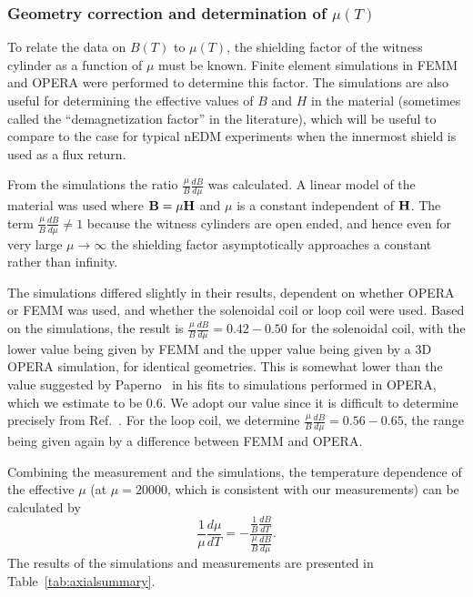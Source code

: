 




\subsubsection{Geometry correction and determination of $\mu(T)$\label{sec:axialsims}}

To relate the data on $B(T)$ to $\mu(T)$, the shielding factor of the
witness cylinder as a function of $\mu$ must be known.  Finite element
simulations in FEMM and OPERA were performed to determine this factor.
The simulations are also useful for determining the effective values
of $B$ and $H$ in the material (sometimes called the ``demagnetization
factor'' in the literature), which will be useful to compare to the
case for typical nEDM experiments when the innermost shield is used as
a flux return.


From the simulations the ratio $\frac{\mu}{B} \frac{dB}{d\mu}$ was
calculated.  A linear model of the material was used where
$\bold{B}=\mu \bold{H}$ and $\mu$ is a constant independent of
$\bold{H}$.  The term $\frac{\mu}{B}\frac{dB}{d\mu}\neq 1$ because the
witness cylinders are open ended, and hence even for very large
$\mu\rightarrow\infty$ the shielding factor asymptotically approaches
a constant rather than infinity.

The simulations differed slightly in their results, dependent on
whether OPERA or FEMM was used, and whether the solenoidal coil or
loop coil were used.
Based on the simulations, the result is
$\frac{\mu}{B}\frac{dB}{d\mu}=0.42-0.50$ for the solenoidal coil, with
the lower value being given by FEMM and the upper value being given by
a 3D OPERA simulation, for identical geometries.  This is somewhat
lower than the value suggested by
Paperno~\cite{bib:paperno-open-ended} in his fits to simulations
performed in OPERA, which we estimate to be 0.6.  We adopt our value
since it is difficult to determine precisely from
Ref.~\cite{bib:paperno-open-ended}.  For the loop coil, we determine
$\frac{\mu}{B}\frac{dB}{d\mu}=0.56-0.65$, the range being given again
by a difference between FEMM and OPERA.


Combining the measurement and the simulations, the temperature
dependence of the effective $\mu$ (at $\mu=20 000$, which is consistent
with our measurements) can be calculated by
\begin{equation}
\frac{1}{\mu}\frac{d\mu}{dT}=-\frac{\frac{1}{B}\frac{dB}{dT}}{\frac{\mu}{B}\frac{dB}{d\mu}}.
\end{equation}
The results of the simulations and measurements are presented in
Table~\ref{tab:axialsummary}.


